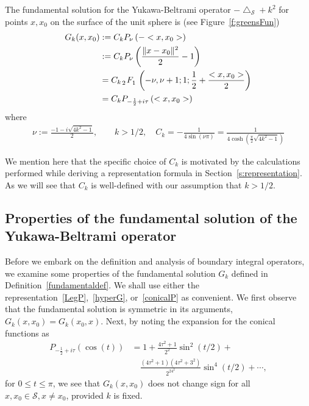 \documentclass[final]{siamltex}
\newcommand{\lap}{\bigtriangleup}
\newcommand{\C}{C_k}
\renewcommand{\S} {\mathcal{S}}
\begin{document}
\begin{definition}
\label{fundamentaldef} 
The fundamental solution for the Yukawa-Beltrami operator $-\lap_\S +
k^2$ for points $x,x_0$ on the surface of the unit sphere is (see
Figure~\ref{f:greensFun})
\begin{subequations}
  \begin{align}
    G_k(x,x_{0})&:=\C P_{\nu}\left(-<x,x_{0}>\right) \nonumber \\
    &:=\C P_{\nu}\left(\frac{\|x-x_{0}\|^2}{2}-1\right) \label{LegP} \\
    &= \C\, \tensor[_2]{F}{_1} \left(-\nu, \nu+1; 1; \frac{1}{2}+
      \frac{<x,x_{0}>}{2}\right)\label{hyperG} \\
    &=\C P_{-\frac{1}{2} + i \tau} \left(<x,x_{0}>\right)\label{conicalP}
  \end{align} 
\end{subequations}
where 
\begin{align*}
  \nu:=\frac{-1-i\sqrt{4k^2-1}}{2},\qquad k>1/2,\quad 
    \C=-\frac{1}{4\sin(\nu\pi)} 
    =\frac{1}{4\cosh(\frac{\pi}{2}\sqrt{4k^2-1})}
\end{align*}
\end{definition}
We mention here that the specific choice of $\C$ is motivated by the
calculations performed while deriving a representation formula in
Section~\ref{s:representation}.  As we will see that $\C$ is
well-defined with our assumption that $k>1/2$.


\subsection{Properties of the fundamental solution of the Yukawa-Beltrami operator}
Before we embark on the definition and analysis of boundary integral operators, we examine some properties of the fundamental solution $G_k$
defined in Definition~\ref{fundamentaldef}. We shall use either the
representation~\eqref{LegP},~\eqref{hyperG}, or~\eqref{conicalP} as
convenient. 
We first observe that the fundamental solution is symmetric in its arguments, $G_k(x,x_{0}) = G_k(x_{0},x)$. Next, by noting the expansion for the conical functions as~\cite{lebedev}
\begin{align*}
  P_{-\frac{1}{2}+i \tau} (\cos(t)) &= 1+
    \frac{4\tau^2+1}{2^2}\sin^2(t/2) + \\
    & \quad \frac{(4\tau^2+1)(4\tau^2+3^2)}{2^24^2}\sin^4(t/2) + 
    \cdots,
\end{align*}
for $0\leq t\leq \pi$, we see that $G_k(x,x_0)$ does not change sign for
all $x,x_{0} \in \S, x \neq x_{0}$, provided $k$ is fixed.
\end{document}
